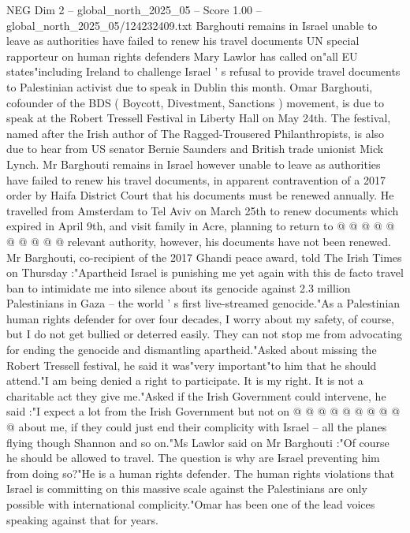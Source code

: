 \begin{textsample}{NEG Dim 2 – global\_north\_2025\_05 – Score 1.00 – global\_north\_2025\_05/124232409.txt}  \label{ex:f2_neg_230}
Barghouti remains in Israel unable to leave as authorities have failed to renew his travel documents UN special rapporteur on human rights defenders Mary Lawlor has called on"all EU states"including Ireland to challenge Israel ' s refusal to provide travel documents to Palestinian activist due to speak in Dublin this month.
Omar Barghouti, cofounder of the BDS ( Boycott, Divestment, Sanctions ) movement, is due to speak at the Robert Tressell Festival in Liberty Hall on May 24th.
The festival, named after the Irish author of The Ragged-Trousered Philanthropists, is also due to hear from US senator Bernie Saunders and British trade unionist Mick Lynch.
Mr Barghouti remains in Israel however unable to leave as authorities have failed to renew his travel documents, in apparent contravention of a 2017 order by Haifa District Court that his documents must be renewed annually.
He travelled from Amsterdam to Tel Aviv on March 25th to renew documents which expired in April 9th, and visit family in Acre, planning to return to @ @ @ @ @ @ @ @ @ @ relevant authority, however, his documents have not been renewed.
Mr Barghouti, co-recipient of the 2017 Ghandi peace award, told The Irish Times on Thursday :"Apartheid Israel is punishing me yet again with this de facto travel ban to intimidate me into silence about its genocide against 2.3 million Palestinians in Gaza -- the world ' s first live-streamed genocide."As a Palestinian human rights defender for over four decades, I worry about my safety, of course, but I do not get bullied or deterred easily.
They can not stop me from advocating for ending the genocide and dismantling apartheid."Asked about missing the Robert Tressell festival, he said it was"very important"to him that he should attend."I am being denied a right to participate.
It is my right.
It is not a charitable act they give me."Asked if the Irish Government could intervene, he said :"I expect a lot from the Irish Government but not on @ @ @ @ @ @ @ @ @ @ about me, if they could just end their complicity with Israel -- all the planes flying though Shannon and so on."Ms Lawlor said on Mr Barghouti :"Of course he should be allowed to travel.
The question is why are Israel preventing him from doing so?"He is a human rights defender.
The human rights violations that Israel is committing on this massive scale against the Palestinians are only possible with international complicity."Omar has been one of the lead voices speaking against that for years.

\end{textsample}
